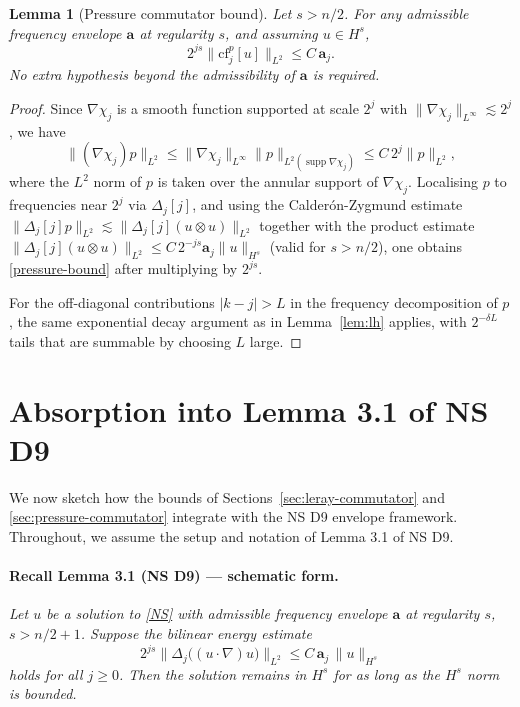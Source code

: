 \documentclass[11pt]{article}
\newtheorem{lemma}{Lemma}
\theoremstyle{definition}
\newcommand{\Dj}{\Delta_j}            %
\newcommand{\Lp}[1]{L^{#1}}
\newcommand{\Hs}[1]{H^{#1}}
\newcommand{\norm}[1]{\lVert #1 \rVert}
\newcommand{\abs}[1]{\lvert #1 \rvert}
\newcommand{\supp}{\operatorname{supp}}
\newcommand{\cf}{\mathrm{cf}}         %
\newcommand{\env}{\mathbf{a}}         %
\begin{document}
\begin{lemma}[Pressure commutator bound]\label{lem:pressure}
Let $s > n/2$.  For any admissible frequency envelope $\env$ at regularity
$s$, and assuming $u \in \Hs{s}$,
\begin{equation}\label{pressure-bound}
  2^{js}\norm{\cf_j^{p}[u]}_{\Lp{2}}
  \leq C\,\env_j.
\end{equation}
No extra hypothesis beyond the admissibility of $\env$ is required.
\end{lemma}

\begin{proof}
Since $\nabla\chi_j$ is a smooth function supported at scale $2^j$ with
$\norm{\nabla\chi_j}_{\Lp{\infty}} \lesssim 2^j$, we have
\[
  \norm{(\nabla\chi_j)p}_{\Lp{2}}
  \leq \norm{\nabla\chi_j}_{\Lp{\infty}}\norm{p}_{\Lp{2}(\supp\nabla\chi_j)}
  \leq C\,2^j\norm{p}_{\Lp{2}},
\]
where the $\Lp{2}$ norm of $p$ is taken over the annular support of
$\nabla\chi_j$.  Localising $p$ to frequencies near $2^j$ via
$\Dj[j]$, and using the Calderón-Zygmund estimate
$\norm{\Dj[j] p}_{\Lp{2}} \lesssim \norm{\Dj[j](u\otimes u)}_{\Lp{2}}$
together with the product estimate
$\norm{\Dj[j](u\otimes u)}_{\Lp{2}} \leq C\,2^{-js}\env_j\norm{u}_{\Hs{s}}$
(valid for $s > n/2$), one obtains \eqref{pressure-bound} after
multiplying by $2^{js}$.

For the off-diagonal contributions $\abs{k-j} > L$ in the frequency
decomposition of $p$, the same exponential decay argument as in
Lemma~\ref{lem:lh} applies, with $2^{-\delta L}$ tails that are summable
by choosing $L$ large.
\end{proof}

\section{Absorption into Lemma 3.1 of NS D9}
\label{sec:absorption}

We now sketch how the bounds of Sections~\ref{sec:leray-commutator} and
\ref{sec:pressure-commutator} integrate with the NS D9 envelope framework.
Throughout, we assume the setup and notation of Lemma 3.1 of NS D9.

\paragraph{Recall Lemma 3.1 (NS D9) — schematic form.}
\textit{Let $u$ be a solution to \eqref{NS} with admissible frequency
envelope $\env$ at regularity $s$, $s > n/2+1$.  Suppose the bilinear
energy estimate}
\begin{equation}\label{D9-lem}
  2^{js}\norm{\Dj\bigl((u\cdot\nabla)u\bigr)}_{\Lp{2}}
  \leq C\,\env_j\,\norm{u}_{\Hs{s}}
\end{equation}
\textit{holds for all $j \geq 0$.  Then the solution remains in $\Hs{s}$
for as long as the $\Hs{s}$ norm is bounded.}
\end{document}
